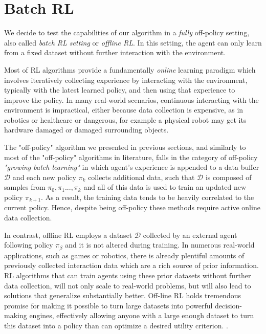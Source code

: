 \chapter{Batch RL}\label{chapter:batchrl}

We decide to test the capabilities of our algorithm in a \textit{fully} off-policy setting, 
also called \textit{batch RL setting} or \textit{offline RL}. In this setting, the agent 
can only learn from a fixed dataset without further interaction with the environment.

Most of RL algorithms provide a fundamentally \textit{online} learning paradigm which involves
iteratively collecting experience by interacting with the environment, typically with the latest learned policy, and then
using that experience to improve the policy. 
In many  real-world scenarios, continuous interacting with the environment is impractical, either because 
data collection is expensive, as in robotics or healthcare or dangerous, for example a physical robot may
get its hardware damaged or damaged surrounding objects.


The "off-policy" algorithm we presented in previous sections, and similarly to most of the "off-policy"
algorithms in literature, falls in the category of 
off-policy \textit{"growing batch learning"} in which agent's experience is appended to a data buffer 
$\mathcal{D}$ and each new policy $\pi_k$ collects additional data, such that $\mathcal{D}$
is composed of samples from $\pi_0,\pi_1...,\pi_k$ and all of this data is used to train an updated new
policy $\pi_{k+1}$. As a result, the training data tends to be heavily correlated to the current policy.
Hence, despite being off-policy these methods require active online data collection.

In contrast, offline RL employs a dataset $\mathcal{D}$ collected by an external agent following policy $\pi_\beta$
and it is not altered during training.
In numerous real-world applications, such as games or robotics, there is already plentiful amounts 
of previously collected interaction data which are a rich source of prior information.
RL algorithms that can train agents using these prior datasets without further data collection,
will not only scale to real-world problems, but will also lead to solutions that generalize substantially better.
Off-line RL holds tremendous promise for making it possible to turn large datasets into powerful 
decision-making engines, effectively allowing anyone with a large enough dataset to turn this dataset
into a policy than can optimize a desired utility criterion. \citep{levine2020}.





